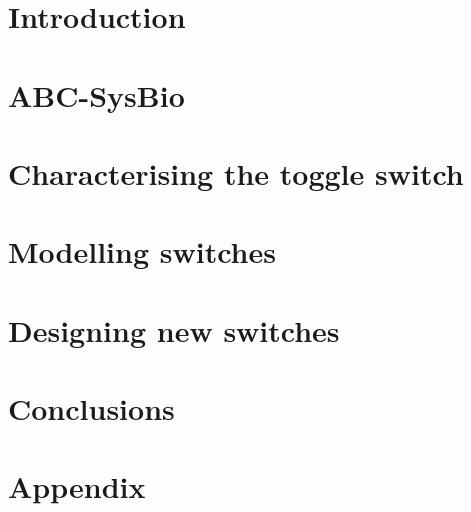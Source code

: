 \documentclass[]{phdthesis}
\begin{document}
\setcounter{secnumdepth}{4}
\setcounter{tocdepth}{4}
\tableofcontents* 
\newpage
\listoffigures
\newpage
\listoftables
\pagestyle{plain}


\mainmatter*
\chapter{Introduction}


\mainmatter*
\chapter{ABC-SysBio}


\mainmatter*
\chapter{Characterising the toggle switch}



\mainmatter*
\chapter{Modelling switches}







\mainmatter*
\chapter{Designing new switches}


\mainmatter*
\chapter{Conclusions}

\printbibliography

\appendix*
\chapter{Appendix}

\end{document}
